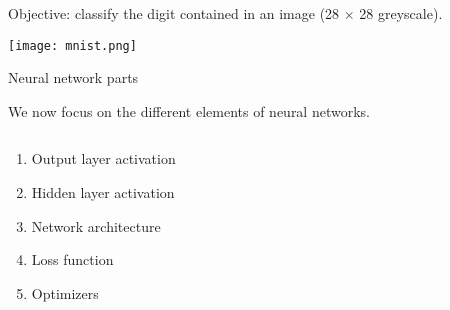 \documentclass[
  10pt,
  ignorenonframetext,
]{beamer}
\providecommand{\tightlist}{%
  \setlength{\itemsep}{0pt}\setlength{\parskip}{0pt}}
\begin{document}
\begin{frame}
Objective: classify the digit contained in an image (28 \(\times\) 28
greyscale).

\texttt{[image: mnist.png]}
\end{frame}

\begin{frame}
\begin{block}{Neural network parts}
\protect\hypertarget{neural-network-parts}{}
\(~\)

We now focus on the different elements of neural networks.

\(~\)

\begin{enumerate}
[1)]
\tightlist
\item
  Output layer activation
\end{enumerate}

\vspace{2mm}

\begin{enumerate}
[1)]
\setcounter{enumi}{1}
\tightlist
\item
  Hidden layer activation
\end{enumerate}

\vspace{2mm}

\begin{enumerate}
[1)]
\setcounter{enumi}{2}
\tightlist
\item
  Network architecture
\end{enumerate}

\vspace{2mm}

\begin{enumerate}
[1)]
\setcounter{enumi}{3}
\tightlist
\item
  Loss function
\end{enumerate}

\vspace{2mm}

\begin{enumerate}
[1)]
\setcounter{enumi}{4}
\tightlist
\item
  Optimizers
\end{enumerate}
\end{block}
\end{frame}
\end{document}
